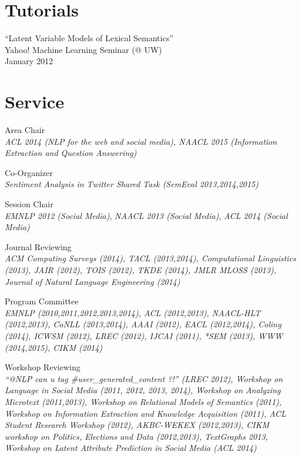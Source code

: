 \documentclass[margin,line]{res}
\begin{document}
\begin{resume}
\section{\sc Tutorials}
``Latent Variable Models of Lexical Semantics'' \\
Yahoo! Machine Learning Seminar (@ UW) \\
January 2012


\begin{comment}
``Profiling NAVDAS'' \\
Naval Research Laboratory Monterey, CA \\
August 2006

``Profiling Parallel Fortran/MPI programs using TAU'' (Training Class for NRL Scientists) \\
Naval Research Laboratory Monterey, CA \\
August 2006
\end{comment}

\section{\sc Service}
Area Chair \\
\emph{ACL 2014 (NLP for the web and social media), NAACL 2015 (Information Extraction and Question Answering)}

Co-Organizer \\
\emph{Sentiment Analysis in Twitter Shared Task (SemEval 2013,2014,2015)}

Session Chair \\
\emph{EMNLP 2012 (Social Media)}, \emph{NAACL 2013 (Social Media)}, \emph{ACL 2014 (Social Media)}

Journal Reviewing \\
\emph{ACM Computing Surveys (2014), TACL (2013,2014), Computational Linguistics (2013), JAIR (2012), TOIS (2012), TKDE (2014), JMLR MLOSS (2013), Journal of Natural Language Engineering (2014)}

Program Committee \\
\emph{EMNLP (2010,2011,2012,2013,2014), ACL (2012,2013), NAACL-HLT (2012,2013), CoNLL (2013,2014), AAAI (2012), EACL (2012,2014), Coling (2014), ICWSM (2012), LREC (2012), IJCAI (2011), *SEM (2013), WWW (2014,2015), CIKM (2014)}

Workshop Reviewing \\
\emph{``@NLP can u tag \#user\_generated\_content ?!'' (LREC 2012), Workshop on Language in Social Media (2011, 2012, 2013, 2014), Workshop on Analyzing Microtext (2011,2013), Workshop on Relational Models of Semantics (2011), Workshop on Information Extraction and Knowledge Acquisition (2011), ACL Student Research Workshop (2012), AKBC-WEKEX (2012,2013), CIKM workshop on Politics, Elections and Data (2012,2013), TextGraphs 2013, Workshop on Latent Attribute Prediction in Social Media (ACL 2014)}


\end{resume}
\end{document}
